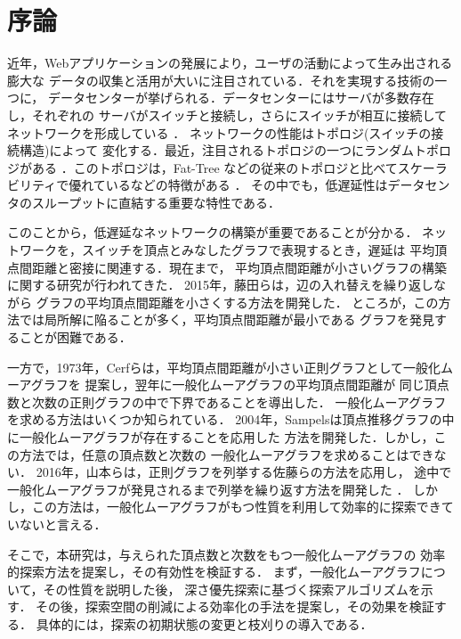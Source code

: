 
\chapter{序論}
近年，Webアプリケーションの発展により，ユーザの活動によって生み出される膨大な
データの収集と活用が大いに注目されている．それを実現する技術の一つに，
データセンターが挙げられる．データセンターにはサーバが多数存在し，それぞれの
サーバがスイッチと接続し，さらにスイッチが相互に接続してネットワークを形成している
\cite{Greenberg2009,Al-Fares2008}．
ネットワークの性能はトポロジ(スイッチの接続構造)によって
変化する．最近，注目されるトポロジの一つにランダムトポロジがある
\cite{Singla2011,Koibuchi2012}．このトポロジは，Fat-Tree\cite{Al-Fares2008}
などの従来のトポロジと比べてスケーラビリティで優れているなどの特徴がある
\cite{Singla2011}．
その中でも，低遅延性はデータセンタのスループットに直結する重要な特性である．

このことから，低遅延なネットワークの構築が重要であることが分かる．
ネットワークを，スイッチを頂点とみなしたグラフで表現するとき，遅延は
平均頂点間距離と密接に関連する．現在まで，
平均頂点間距離が小さいグラフの構築に関する研究が行われてきた．
2015年，藤田らは，辺の入れ替えを繰り返しながら
グラフの平均頂点間距離を小さくする方法を開発した\cite{Fujita2015}．
ところが，この方法では局所解に陥ることが多く，平均頂点間距離が最小である
グラフを発見することが困難である．

一方で，1973年，Cerfらは，平均頂点間距離が小さい正則グラフとして一般化ムーアグラフを
提案し\cite{Cerf1973}，翌年に一般化ムーアグラフの平均頂点間距離が
同じ頂点数と次数の正則グラフの中で下界であることを導出した\cite{Cerf1974Lower}．
一般化ムーアグラフを求める方法はいくつか知られている．
2004年，Sampelsは頂点推移グラフの中に一般化ムーアグラフが存在することを応用した
方法を開発した\cite{Sampels2004}．しかし，この方法では，任意の頂点数と次数の
一般化ムーアグラフを求めることはできない．
2016年，山本らは，正則グラフを列挙する佐藤らの方法\cite{Sato2008}を応用し，
途中で一般化ムーアグラフが発見されるまで列挙を繰り返す方法を開発した
\cite{Yamamoto2016}．
しかし，この方法は，一般化ムーアグラフがもつ性質を利用して効率的に探索できて
いないと言える．

そこで，本研究は，与えられた頂点数と次数をもつ一般化ムーアグラフの
効率的探索方法を提案し，その有効性を検証する．
まず，一般化ムーアグラフについて，その性質を説明した後，
深さ優先探索に基づく探索アルゴリズムを示す．
その後，探索空間の削減による効率化の手法を提案し，その効果を検証する．
具体的には，探索の初期状態の変更と枝刈りの導入である．

